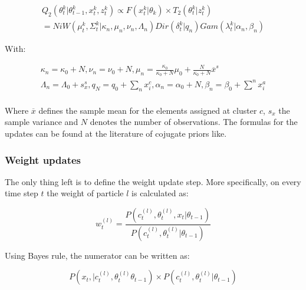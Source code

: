 \documentclass[]{article}
\begin{document}
    \begin{equation} \label{Q_2}
        \begin{split}
            Q_2(\theta_t^k | \theta_{t-1}^k , x_t^k, z_t^k) \propto F( x_t^k | \theta_k) \times T_2(\theta_t^k | z_t^k) \\
            = NiW( \mu_t^k, \Sigma_t^k | \kappa_n, \mu_n, \nu_n, \Lambda_n ) Dir(\delta_t^k | q_n) Gam(\lambda_t^k | \alpha_n, \beta_n)
        \end{split}
    \end{equation}

    With:

    \begin{equation} \label{udpates}
        \begin{split}
            \kappa_n = \kappa_0 + N, 
            \nu_n = \nu_0 + N, 
            \mu_n = \frac{\kappa_0}{\kappa_0 + N} \mu_0 +  \frac{N}{\kappa_0 + N} \overline{x}^s\\
            \Lambda_n = \Lambda_0 + s_{x}^s,
            q_N = q_0 +  \sum_n x_i^c,
            \alpha_n = \alpha_0 +  N,
            \beta_n = \beta_0 +  \sum^n x_i^a\\
        \end{split}
    \end{equation}


    Where $\overline{x}$ defines the sample mean for the elements assigned at cluster $c$, $s_{x}$ the sample variance and $N$ denotes the number of observations. The formulas for the updates can be found at the literature of cojugate priors like\cite{compendium}.

    \subsubsection{Weight updates}

    The only thing left is to define the weight update step. More specifically, on every time step $t$ the weight of particle $l$ is calculated as:

    \begin{equation}
        w_t^{(l)} = \frac {P(c_t^{(l)} , \theta_t^{(l)}, x_t| 	\theta_{t-1} )}{P(c_t^{(l)} , \theta_t^{(l)}| 	\theta_{t-1} )}
    \end{equation}

    Using Bayes rule, the numerator can be written as:

    \begin{equation}
        P(x_t , | c_t^{(l)} , \theta_t^{(l)} \theta_{t-1} ) \times P(c_t^{(l)} , \theta_t^{(l)}|  \theta_{t-1} )
    \end{equation}
\end{document}

